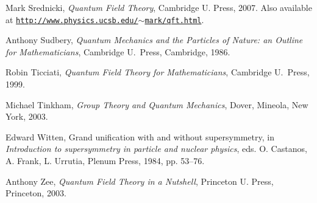 \documentclass{article}
\begin{document}
\begin{thebibliography}{99}
Mark Srednicki, {\em {Quantum Field Theory}}, Cambridge U. Press, 2007.
Also available at \href{http://www.physics.ucsb.edu/$\sim$mark/qft.html}
{\texttt{http://www.physics.ucsb.edu/$\sim$mark/qft.html}}.

Anthony Sudbery, {\em {Quantum Mechanics and the Particles of Nature: 
an Outline for Mathematicians}}, Cambridge U.\ Press, Cambridge, 1986.

Robin Ticciati, {\em {Quantum Field Theory for Mathematicians}}, Cambridge U.\
Press, 1999.

Michael Tinkham, {\em {Group Theory and Quantum Mechanics}}, 
Dover, Mineola, New York, 2003.

Edward Witten, Grand unification with and without supersymmetry, in {\em
{Introduction to supersymmetry in particle and nuclear physics}}, eds. O.
Castanos, A. Frank, L. Urrutia, Plenum Press, 1984, pp. 53--76.

Anthony Zee, {\em {Quantum Field Theory in a Nutshell}}, Princeton U. Press,
Princeton, 2003.

\end{thebibliography}
\end{document}
